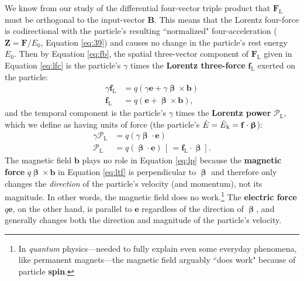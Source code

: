 \documentclass[12pt]{article}
\renewcommand{\vv}[1]{\mathbf{#1}}
\newcommand{\vvbeta}{\bm{\upbeta}}
\begin{document}
We know from our study of the differential four-vector triple product that $\vv F_{\mathrm{L}}$ must be orthogonal to the input-vector $\vv B$. This means that the Lorentz four-force is codirectional with the particle's resulting ``normalized" four-acceleration ($\vv Z =  \vv F / E_0$, Equation \ref{eq:39}) and causes no change in the particle's rest energy $E_0$. Then by Equation \ref{eq:fb}, the spatial three-vector component of $\vv F_{\textrm{L}}$ given in Equation \ref{eq:lfc} is the particle's $\gamma$ times the \textbf{Lorentz three-force} $\vv f_{\textrm{L}}$ exerted on the particle:
\begin{equation}\label{eq:ltf}
\begin{split}
\gamma \vv f_{\textrm{L}} &= q ( \gamma \vv e + \gamma \vvbeta \times \vv b ) \\
\vv f_{\textrm{L}} &= q ( \vv e + \vvbeta \times \vv b ),
\end{split}
\end{equation}
and the temporal component is the particle's $\gamma$ times the \textbf{Lorentz power} $\mathcal{P}_{\textrm{L}}$, which we define as having units of force (the particle's $\dot{E} = \dot{E}_{\mkern.5mu \textrm{k}} = \vv f \cdot \vvbeta$):
\begin{equation}\label{eq:lp}
\begin{split}
\gamma \mathcal{P}_{\textrm{L}} &= q ( \gamma \vvbeta \cdot \vv e ) \\
\mathcal{P}_{\textrm{L}} &= q ( \vvbeta \cdot \vv e ) \, \left[ \, = \vv f_{\textrm{L}} \cdot \vvbeta \right].
\end{split}
\end{equation}
The magnetic field $\vv b$ plays no role in Equation \ref{eq:lp} because the \textbf{magnetic force} $q \vvbeta \times \vv b$ in Equation \ref{eq:ltf} is perpendicular to $\vvbeta$ and therefore only changes the \emph{direction} of the particle's velocity (and momentum), not its magnitude. In other words, the magnetic field does no work.\footnote{In \emph{quantum} physics---needed to fully explain even some everyday phenomena, like permanent magnets---the magnetic field arguably ``does work" because of particle \textbf{spin}.} The \textbf{electric force} $q \vv e$, on the other hand, is parallel to $\vv e$ regardless of the direction of $\vvbeta$, and generally changes both the direction and magnitude of the particle's velocity.
\end{document}
